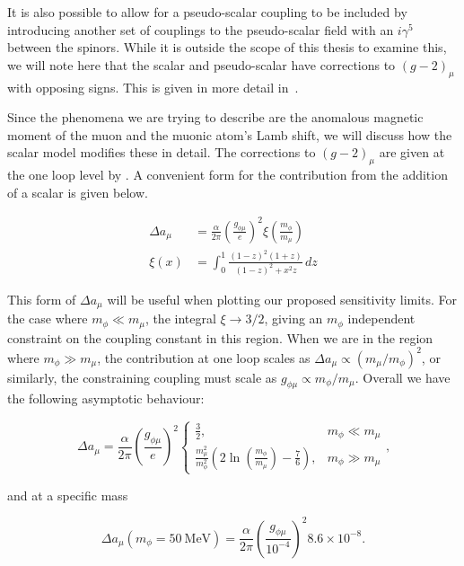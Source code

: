 It is also possible to allow for a pseudo-scalar coupling to be included by introducing another set of couplings to the pseudo-scalar field with an $i\gamma^5$ between the spinors.
While it is outside the scope of this thesis to examine this, we will note here that the scalar and pseudo-scalar have corrections to $(g-2)_\mu$ with opposing signs.
This is given in more detail in~\cite{Carlson:2015jba}.

Since the phenomena we are trying to describe are the anomalous magnetic moment of the muon and the muonic atom's Lamb shift, we will discuss how the scalar model modifies these in detail.
The corrections to $(g-2)_\mu$ are given at the one loop level by \cite{Leveille:1977rc, McKeen:2009ny, TuckerSmith:2010ra}.
A convenient form for the contribution from the addition of a scalar is given below.

\begin{align}
    \Delta a_\mu &= \frac{\alpha}{2\pi} \left(\frac{g_{\phi\mu}}{e}\right)^2 \xi\left(\frac{m_\phi}{m_\mu}\right) \\
    \xi(x) &= \int_0^1 \frac{(1-z)^2(1+z)}{(1-z)^2 + x^2z} \,dz
\end{align}

\noindent This form of $\Delta a_\mu$ will be useful when plotting our proposed sensitivity limits.
For the case where $m_\phi \ll m_\mu$, the integral $\xi \rightarrow 3/2$, giving an $m_\phi$ independent constraint on the coupling constant in this region.
When we are in the region where $m_\phi \gg m_\mu$, the contribution at one loop scales as $\Delta a_\mu \propto (m_\mu/m_\phi)^2$, or similarly, the constraining coupling must scale as $g_{\phi\mu} \propto m_\phi / m_\mu$.
Overall we have the following asymptotic behaviour:

\begin{equation}
    \Delta a_\mu = \frac{\alpha}{2\pi} \left(\frac{g_{\phi \mu}}{e}\right)^2
    \begin{cases}
        \frac{3}{2}, & m_\phi \ll m_\mu \\
        \frac{m_\mu^2}{m_\phi^2} \left(2\ln\left(\frac{m_\phi}{m_\mu}\right) - \frac{7}{6}\right), & m_\phi \gg m_\mu
    \end{cases}\textrm{,}
\end{equation}

\noindent and at a specific mass

\begin{equation}
    \Delta a_\mu\left(m_\phi = 50~\textrm{MeV}\right) = \frac{\alpha}{2\pi} \left(\frac{g_{\phi\mu}}{10^{-4}}\right)^2 8.6\times 10^{-8}\textrm{.}
\end{equation}

